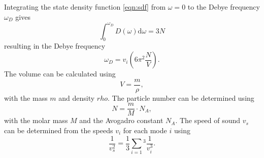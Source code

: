 Integrating the state density function \eqref{eqn:sdf} from 
$\omega=0$ to the Debye frequency $\omega_D$ gives
\begin{equation}
    \int_0^{\omega_D}D(\omega)\text{d}\omega=3N
\end{equation}
resulting in the Debye frequency
\begin{equation}
    \omega_D=v_i\left(6\pi^2\frac{N}{V}\right).
\end{equation}
The volume can be calculated using
\begin{equation}
 V = \frac{m}{\rho},
\end{equation}
with the mass $m$ and density $rho$. The particle number can be determined using
\begin{equation}
 N = \frac{m}{M} \cdot N_{A},
\end{equation}
with the molar mass $M$ and the Avogadro constant $N_{A}$.
The speed of sound $v_s$ can be determined from the speeds $v_i$ for each mode $i$ using
\begin{equation}
    \frac{1}{v_s^2}=\frac{1}{3}\sum_{i=1}{^3}\frac{1}{v_i^3}.
\end{equation}
